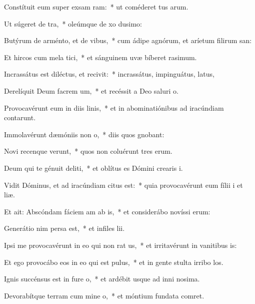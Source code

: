 \item Constítuit eum super exsam ram:~* ut coméderet tus arum.
\item Ut súgeret  de tra,~* oleúmque de xo dusimo:
\item Butýrum de arménto, et  de vibus,~* cum ádipe agnórum, et aríetum filirum san:
\item Et hircos cum mela tici,~* et sánguinem uvæ bíberet rasimum.
\item Incrassátus est diléctus, et recivit:~* incrassátus, impinguátus, latus,
\item Derelíquit Deum facrem um,~* et recéssit a Deo saluri o.
\item Provocavérunt eum in diis linis,~* et in abominatiónibus ad iracúndiam contarunt.
\item Immolavérunt dæmóniis  non o,~* diis quos gnobant:
\item Novi recenque verunt,~* quos non coluérunt tres erum.
\item Deum qui te génuit deliti,~* et oblítus es Dómini crearis i.
\item \singlecolsep
\item Vidit Dóminus, et ad iracúndiam citus est:~* quia provocavérunt eum fílii i et liæ.
\item Et ait: Abscóndam fáciem am ab is,~* et considerábo novíssi erum:
\item Generátio nim persa est,~* et infiles lii.
\item Ipsi me provocavérunt in eo qui non rat us,~* et irritavérunt in vanitibus is:
\item Et ego provocábo eos in eo qui  est pulus,~* et in gente stulta irribo los.
\item Ignis succénsus est in fure o,~* et ardébit usque ad inni nosima.
\item Devorabítque terram cum mine o,~* et móntium fundata comret.
